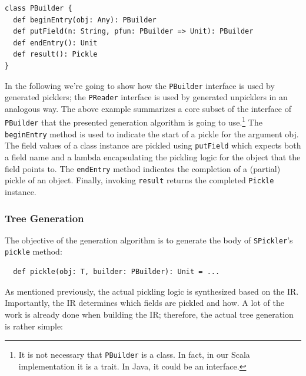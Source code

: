 \documentclass[preprint,10pt]{sigplanconf}
\theoremstyle{definition}
\theoremstyle{definition}
\newcommand{\term}[1]{\mbox{\texttt{#1}}}
\begin{document}
\begin{lstlisting}
class PBuilder {
  def beginEntry(obj: Any): PBuilder
  def putField(n: String, pfun: PBuilder => Unit): PBuilder
  def endEntry(): Unit
  def result(): Pickle
}
\end{lstlisting}

In the following we're going to show how the \verb|PBuilder| interface is used
by generated picklers; the \verb|PReader| interface is used by generated
unpicklers in an analogous way. The above example summarizes a core
subset of the interface of \verb|PBuilder| that the presented generation
algorithm is going to use.\footnote{It is not necessary that \texttt{PBuilder}
is a class. In fact, in our Scala implementation it is a trait. In Java, it
could be an interface.} The \verb|beginEntry| method is used to indicate the
start of a pickle for the argument obj. The field values of a class instance
are pickled using \verb|putField| which expects both a field name and a lambda
encapsulating the pickling logic for the object that the field points to. The
\verb|endEntry| method indicates the completion of a (partial) pickle of an
object. Finally, invoking \verb|result| returns the completed \verb|Pickle|
instance.

\subsubsection{Tree Generation}

The objective of the generation algorithm is to generate the body of
\term{SPickler}'s \term{pickle} method:

\begin{lstlisting}
  def pickle(obj: T, builder: PBuilder): Unit = ...
\end{lstlisting}

As mentioned previously, the actual pickling logic is synthesized based on the
IR. Importantly, the IR determines which fields are pickled and how. A lot of
the work is already done when building the IR; therefore, the actual tree
generation is rather simple:
\end{document}
